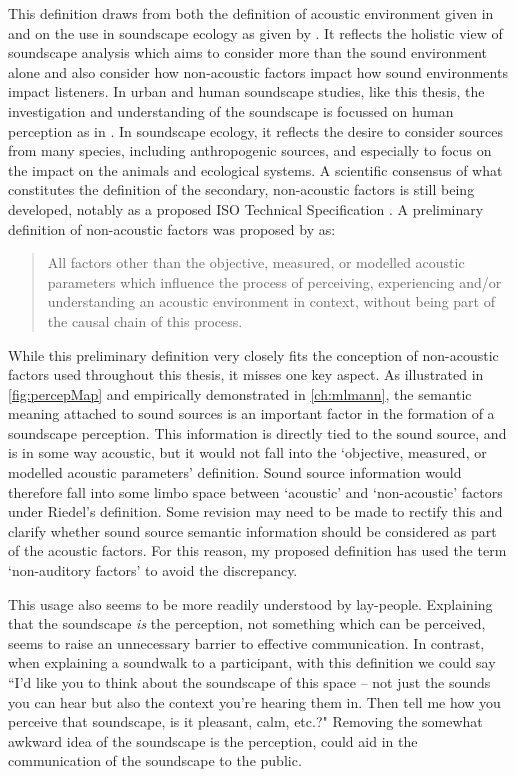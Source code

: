 This definition draws from both the definition of acoustic environment given in \citet{ISO12913Part1} and on the use in soundscape ecology as given by \citet{Pijanowski2011Soundscape}. It reflects the holistic view of soundscape analysis which aims to consider more than the sound environment alone and also consider how non-acoustic factors impact how sound environments impact listeners. In urban and human soundscape studies, like this thesis, the investigation and understanding of the soundscape is focussed on human perception as in \citet{ISO12913Part1}. In soundscape ecology, it reflects the desire to consider sources from many species, including anthropogenic sources, and especially to focus on the impact on the animals and ecological systems. A scientific consensus of what constitutes the definition of the secondary, non-acoustic factors is still being developed, notably as a proposed ISO Technical Specification \citep{Fenech2021Development}. A preliminary definition of non-acoustic factors was proposed by \citet{Riedel2021Considering} as:

\begin{quote}
  All factors other than the objective, measured, or modelled acoustic parameters which influence the process of perceiving, experiencing and/or understanding an acoustic environment in context, without being part of the causal chain of this process.
\end{quote}

While this preliminary definition very closely fits the conception of non-acoustic factors used throughout this thesis, it misses one key aspect. As illustrated in \cref{fig:percepMap} and empirically demonstrated in \cref{ch:mlmann}, the semantic meaning attached to sound sources is an important factor in the formation of a soundscape perception. This information is directly tied to the sound source, and is in some way acoustic, but it would not fall into the `objective, measured, or modelled acoustic parameters' definition. Sound source information would therefore fall into some limbo space between `acoustic' and `non-acoustic' factors under Riedel's definition. Some revision may need to be made to rectify this and clarify whether sound source semantic information should be considered as part of the acoustic factors. For this reason, my proposed definition has used the term `non-auditory factors' to avoid the discrepancy.

This usage also seems to be more readily understood by lay-people. Explaining that the soundscape \emph{is} the perception, not something which can be perceived, seems to raise an unnecessary barrier to effective communication. In contrast, when explaining a soundwalk to a participant, with this definition we could say ``I'd like you to think about the soundscape of this space -- not just the sounds you can hear but also the context you're hearing them in. Then tell me how you perceive that soundscape, is it pleasant, calm, etc.?" Removing the somewhat awkward idea of the soundscape is the perception, could aid in the communication of the soundscape to the public.

